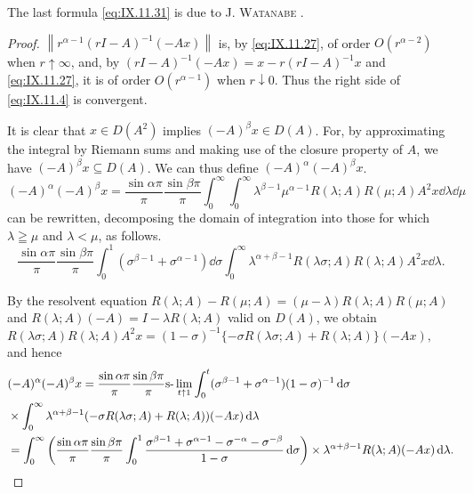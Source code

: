 \begin{remarku} The last formula \eqref{eq:IX.11.31} is due to J. \textsc{Watanabe} \cite{watanabe331}. 
\end{remarku}

\begin{proof}
 $\left\|r^{\alpha-1}(rI-A)^{-1}(-Ax)\right\|$ is, by \eqref{eq:IX.11.27}, of order $O(r^{\alpha-2})$ when $r\uparrow\infty$, and, by $(rI-A)^{-1}(-Ax)=x-r(rI-A)^{-1}x$ and \eqref{eq:IX.11.27}, it is of order $O(r^{\alpha-1})$ when $r\downarrow0$. Thus the right side of \eqref{eq:IX.11.4} is convergent. 


It is clear that $x \in D(A^{2})$ implies $(-A)^{\beta}x \in D(A)$. For, by approximating the integral by Riemann sums and making use of the closure property of $A$, we have $(-A)^{\beta}x \subseteq D(A)$. We can thus define $(-A)^{\alpha}(-A)^{\beta}x$. 
\[
(- A) ^{\alpha} (- A) ^{\beta} x = \frac {\sin \alpha \pi}{\pi} \frac {\sin \beta \pi}{\pi} \int_{0} ^{\infty} \int_{0} ^{\infty} \lambda^{\beta -1} \mu^{\alpha -1} R (\lambda ; A) R (\mu ; A) A ^{2} x \dd \lambda \dd \mu
\]
can be rewritten, decomposing the domain of integration into those for which $\lambda \geqq \mu$ and $\lambda < \mu$, as follows. 
\[
\frac {\sin \alpha \pi}{\pi} \frac {\sin \beta \pi}{\pi} \int_{0} ^{1} \left(\sigma^{\beta -1} + \sigma^{\alpha -1}\right) \dd \sigma \int_{0} ^{\infty} \lambda^{\alpha + \beta -1} R (\lambda \sigma ; A) R (\lambda ; A) A ^{2} x \dd \lambda .
\]

By the resolvent equation $R(\lambda; A) - R(\mu; A) = (\mu - \lambda)R(\lambda; A)R(\mu; A)$ and $R(\lambda; A)(-A) = I - \lambda R(\lambda; A)$ valid on $D(A)$, we obtain 
$R(\lambda \sigma ;A)R(\lambda ;A)A^{2}x = (1 - \sigma)^{-1}\{-\sigma R(\lambda \sigma ;A) + R(\lambda ;A)\} (-Ax),$ and hence 
\[
\begin{aligned}
&(- A) ^{\alpha} (- A) ^{\beta} x = \frac {\sin \alpha \pi}{\pi} \frac {\sin \beta \pi}{\pi} \text{s-}\lim _{t \uparrow 1} \int_{0} ^{t} (\sigma^{\beta -1} + \sigma^{\alpha -1}) (1 - \sigma) ^{-1} \mathop{}\!\mathrm{d} \sigma \\
&\times \int_{0} ^{\infty} \lambda^{\alpha + \beta -1} (- \sigma R (\lambda \sigma ; A) + R (\lambda ; A)) (- A x) \mathop{}\!\mathrm{d} \lambda \\
&= \int_{0} ^{\infty} \left(\frac {\sin \alpha \pi}{\pi} \frac {\sin \beta \pi}{\pi} \int_{0} ^{1} \frac {\sigma^{\beta -1} + \sigma^{\alpha -1} - \sigma^{- \alpha} - \sigma^{- \beta}}{1 - \sigma} \mathop{}\!\mathrm{d} \sigma\right) \times \lambda^{\alpha + \beta -1} R (\lambda ; A) (- A x) \mathop{}\!\mathrm{d} \lambda .
\end{aligned}
\]


\end{proof}

